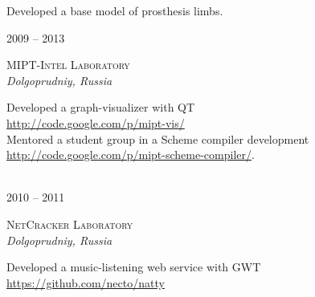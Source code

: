 \documentclass[10pt]{article} %
\begin{document}
\begin{minipage}[h]{0.5\textwidth}
\normalsize{Developed a base model of prosthesis limbs.}\\


{\raggedleft\textsc{2009 -- 2013}\par}

{\raggedright\large \textsc{MIPT-Intel Laboratory}\\
\textit{Dolgoprudniy, Russia}\\[4pt]}

\normalsize{
 Developed a graph-visualizer with QT\\ \url{http://code.google.com/p/mipt-vis/}\\
 Mentored a student group in a Scheme compiler development\\ \url{http://code.google.com/p/mipt-scheme-compiler/}.\\
}\\


{\raggedleft\textsc{2010 -- 2011}\par}

{\raggedright\large \textsc{NetCracker Laboratory}\\
\textit{Dolgoprudniy, Russia}\\[4pt]}

\normalsize{Developed a music-listening web service with GWT\\\url{https://github.com/necto/natty}}\\


\end{minipage} %
\hfill
\end{document}
